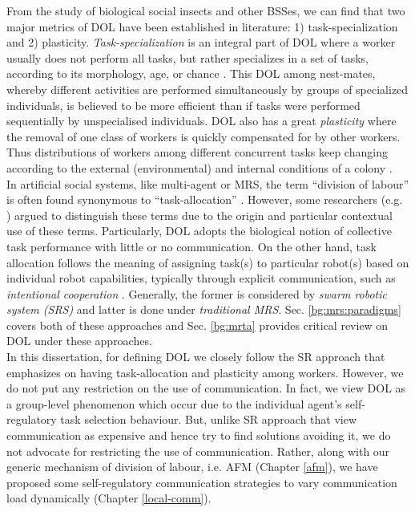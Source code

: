 From the study of biological social insects and other BSSes, we can find that two major metrics of DOL have been established in literature: 1) task-specialization and 2) plasticity. {\em Task-specialization} is an integral part of DOL where a worker usually does not perform all tasks, but rather specializes in a set of tasks, according to its morphology, age, or chance \cite{Bonabeau+1999}. This DOL among nest-mates, whereby different activities are performed simultaneously by groups of specialized individuals, is believed to be more efficient than if tasks were performed sequentially by unspecialised individuals. DOL also has a great {\em plasticity} where the removal of one class of workers is quickly compensated for by other workers. Thus distributions of workers among different concurrent tasks keep changing according to the external (environmental) and internal conditions of a colony \cite{Garnier+2007}.\\
In artificial social systems, like multi-agent or MRS, the term ``division of labour'' is often found synonymous to ``task-allocation'' \cite{Shen+2001}. However, some researchers (e.g. \cite{Labella2007}) argued to distinguish these terms due to the origin and particular contextual use of these terms. Particularly, DOL adopts the biological notion of collective task performance with little or no communication. On the other hand, task allocation follows the meaning of assigning task(s) to particular robot(s) based on individual robot capabilities, typically through explicit communication, such as {\em intentional cooperation} \cite{Parker1998}. Generally, the former is considered by {\em swarm robotic system (SRS)} and latter is done under {\em traditional MRS}. Sec. \ref{bg:mrs:paradigms} covers both of these approaches and Sec. \ref{bg:mrta} provides critical review on DOL under these approaches.\\
In this dissertation, for defining DOL we closely follow the SR approach that emphasizes on having task-allocation and plasticity among workers. However, we do not put any restriction on the use of communication. In fact, we view DOL as a group-level phenomenon which occur due to the individual agent's self-regulatory task selection behaviour. But, unlike SR approach that view communication as expensive and hence try to find solutions avoiding it, we do not advocate for restricting the use of communication. Rather,  along with our generic mechanism of division of labour, i.e. AFM (Chapter \ref{afm}), we have proposed some self-regulatory communication strategies to vary communication load dynamically (Chapter \ref{local-comm}). 
